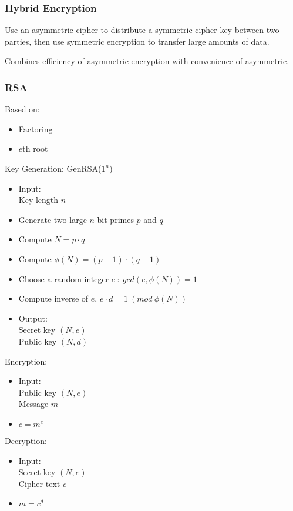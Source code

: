 \documentclass[a4paper]{article}
\begin{document}
\subsubsection{Hybrid Encryption}

Use an asymmetric cipher to distribute a symmetric cipher key between two
parties, then use symmetric encryption to transfer large amounts of data.

Combines efficiency of asymmetric encryption with convenience of asymmetric.

\subsubsection{RSA}
\label{sec:rsa_encryption}

Based on:
\begin{itemize}
  \item Factoring
  \item $e$th root
\end{itemize}

Key Generation: GenRSA($1^{n}$)
\begin{itemize}
  \item
    Input: \\
    Key length $n$
  \item Generate two large $n$ bit primes $p$ and $q$
  \item Compute $N = p \cdot q$
  \item Compute $\phi(N) = (p - 1) \cdot (q - 1)$
  \item Choose a random integer $e \: : \: gcd(e, \phi(N)) = 1$
  \item Compute inverse of $e$, $e \cdot d = 1 \: (mod \: \phi(N))$
  \item
    Output: \\
    Secret key $(N, e)$ \\
    Public key $(N, d)$
\end{itemize}

Encryption:
\begin{itemize}
  \item
    Input: \\
    Public key $(N, e)$ \\
    Message $m$
  \item $c = m^{e}$
\end{itemize}

Decryption:
\begin{itemize}
  \item
    Input: \\
    Secret key $(N, e)$ \\
    Cipher text $c$
  \item $m = c^{d}$
\end{itemize}
\end{document}
